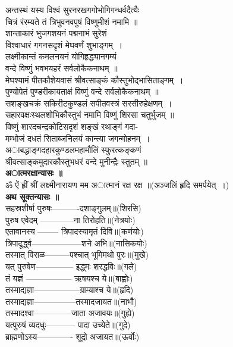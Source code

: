 \documentclass[twoside,top=1.7cm, bottom=1.7cm, outer=1cm,landscape, inner=1.5cm,a5paper,]{book}
\begin{document}
अन्तस्थं यस्य विश्वं सुरनरखगगोभोगिगन्धर्वदैत्यैः\\
     चित्रं रंरम्यते तं त्रिभुवनवपुषं विष्णुमीशं नमामि ॥\\
शान्ताकारं भुजगशयनं पद्मनाभं सुरेशं\\
     विश्वाधारं गगनसदृशं मेघवर्णं शुभाङ्गम्~।\\
लक्ष्मीकान्तं कमलनयनं योगिहृद्ध्यानगम्यं\\
     वन्दे विष्णुं भवभयहरं सर्वलोकैकनाथम् ॥\\
मेघश्यामं पीतकौशेयवासं श्रीवत्साङ्कं कौस्तुभोद्भासिताङ्गम्~।\\
पुण्योपेतं पुण्डरीकायताक्षं विष्णुं वन्दे सर्वलोकैकनाथम् ॥\\
सशङ्खचक्रं सकिरीटकुण्डलं सपीतवस्त्रं सरसीरुहेक्षणम्~।\\
सहारवक्षःस्थलशोभिकौस्तुभं नमामि विष्णुं शिरसा चतुर्भुजम् ॥\\[10pt] 
विष्णुं शारदचन्द्रकोटिसदृशं शङ्खं रथाङ्गं गदा-\\
मम्भोजं दधतं सिताब्जनिलयं कान्त्या जगन्मोहनम्~।\\
अाबद्धाङ्गदहारकुण्डलमहामौलिं स्फुरत्कङ्कणं\\
श्रीवत्साङ्कमुदारकौस्तुभधरं वन्दे मुनीन्द्रैः स्तुतम् ॥\\[10pt]
{\bfseries अात्मरक्षान्यासः ॥}\\
ॐ ऐं ह्रीं श्रीं लक्ष्मीनारायण मम अात्मानं रक्ष रक्ष ॥(अञ्जलिं हृदि समर्पयेत्~।)\\
{\bfseries अथ सूक्तन्यासः ॥}\\
सहस्रशीर्षा पुरुषः----------दशाङ्गुलम्॥(शिरसि)\\
पुरुष एवेदम् ------------ना तिरोहति॥(नेत्रयोः)\\
एतावानस्य -------- त्रिपादस्यामृतं दिवि॥(कर्णयोः)\\
त्रिपादूर्द्ध्व------------------शने अभि॥(नासिकयोः)\\
तस्मात् विराळ---------पश्चात् भूमिमथो पुरः॥(मुखे)\\
यत् पुरुषेण-------------- इद्ध्मः शरद्धविः॥(गले)\\
तं यज्ञं ----------------- ऋषयश्च ये॥(बाह्वोः)\\
तस्माद्यज्ञा-----------------ग्राम्याश्च ये॥(हृदि)\\
तस्माद्यज्ञा---------------तस्मादजायत॥(नाभौ)\\
तस्मादश्वा--------------जाता अजावयः॥(गुह्ये)\\
यत्पुरुषं व्यदधुः----------- पादा उच्येते॥(गुदे)\\
ब्राह्मणोऽस्य------------- शूद्रो अजायत॥(ऊर्वोः)\\
\end{document}
